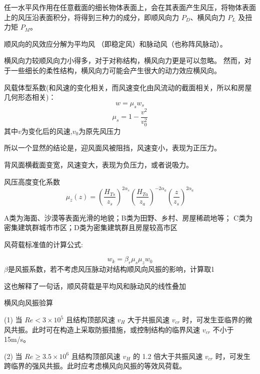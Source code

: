 \documentclass[12pt, a4paper, oneside, UTF8]{ctexbook}
\begin{document}
\begin{remark}
    任一水平风作用在任意截面的细长物体表面上，会在其表面产生风压，将物体表面上的风压沿表面积分，将得到三种力的成分，即顺风向力 \( P_D \)、横风向力 \( P_L \) 及扭力矩 \( P_M \)。
    
    顺风向的风效应分解为平均风 （即稳定风）和脉动风（也称阵风脉动）。

    横风向力较顺风向力小得多，对于对称结构，横风向力更是可以忽略。
    然而，对于一些细长的柔性结构，横风向力可能会产生很大的动力效应横风向。
\end{remark}

\begin{definition}
    风载体型系数(和风速的变化相关，而风速变化由风流动的截面相关，所以和房屋几何形态相关)：
    $$
    w=\mu_s w_s
    $$
    $$
    \mu_s=1-\frac{v^2}{v_{0}^2}
    $$
    其中$v$为变化后的风速,$v_0$为原先风压力
\end{definition}

所以一个显然的结论是，迎风面风被阻挡，风速变小，表现为正压力。

背风面横截面变宽，风速变大，表现为负压力，或者说吸力。

\begin{definition}
    风压高度变化系数
    \[
\mu_z(z) = \left( \frac{H_{Ts}}{z_s} \right)^{2\alpha_s} \left( \frac{H_{Ta}}{z_a} \right)^{-2\alpha_a} \left( \frac{z}{z_s} \right)^{2\alpha_a}
\]
\end{definition}

A类为海面、沙漠等表面光滑的地貌；B类为田野、乡村、房屋稀疏地等；
C类为密集建筑群城市市区；D类为密集建筑群且房屋较高市区

\begin{theorem}
    风荷载标准值的计算公式:

    $$w_k = \beta_r \mu_s \mu_z w_0$$
    $\beta$是风振系数，若不考虑风压脉动对结构顺风向风振的影响，计算取1

    这也解释了一句话，顺风荷载是平均风和脉动风的线性叠加
\end{theorem}



横风向风振验算

(1) 当 $Re < 3 \times 10^5$ 且结构顶部风速 $v_H$ 大于共振风速 $v_{cr}$ 时，可发生亚临界的微风共振。此时可在构造上采取防振措施，或控制结构的临界风速 $v_{cr}$ 不小于 15m/s。

(2) 当 $Re \geq 3.5 \times 10^6$ 且结构顶部风速 $v_H$ 的 1.2 倍大于共振风速 $v_{cr}$ 时，可发生跨临界的强风共振。此时应考虑横风向风振的等效风荷载。
\end{document}
